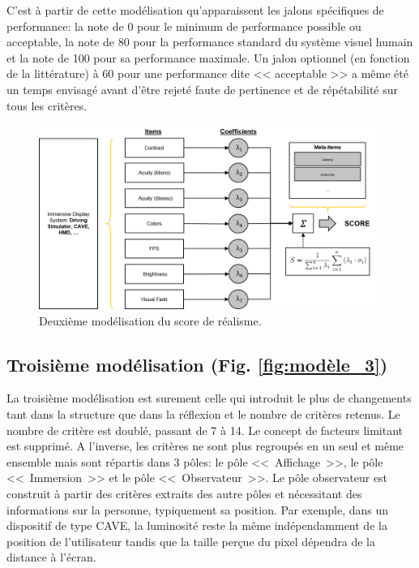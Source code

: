 	\par C'est à partir de cette modélisation qu'apparaissent les jalons spécifiques de performance: la note de 0 pour le minimum de performance possible ou acceptable, la note de 80 pour la performance standard du système visuel humain et la note de 100 pour sa performance maximale. Un jalon optionnel (en fonction de la littérature) à 60 pour une performance dite << acceptable >> a même été un temps envisagé avant d'être rejeté faute de pertinence et de répétabilité sur tous les critères.
	
	\begin{figure}
		\centering
		\includegraphics[scale=.8]{Figures/Modele2}
		\caption{Deuxième modélisation du score de réalisme.}
		\label{fig:modèle_2}
	\end{figure}
	
	\subsection{Troisième modélisation (Fig. \ref{fig:modèle_3})}
	\par La troisième modélisation est surement celle qui introduit le plus de changements tant dans la structure que dans la réflexion et le nombre de critères retenus. Le nombre de critère est doublé, passant de 7 à 14. Le concept de facteurs limitant est supprimé. A l'inverse, les critères ne sont plus regroupés en un seul et même ensemble mais sont répartis dans 3 pôles: le pôle <<~Affichage~>>, le pôle <<~Immersion~>> et le pôle <<~Observateur~>>. Le pôle observateur est construit à partir des critères extraits des autre pôles et nécessitant des informations sur la personne, typiquement sa position. Par exemple, dans un dispositif de type CAVE, la luminosité reste la même indépendamment de la position de l'utilisateur tandis que la taille perçue du pixel dépendra de la distance à l'écran. 
	
